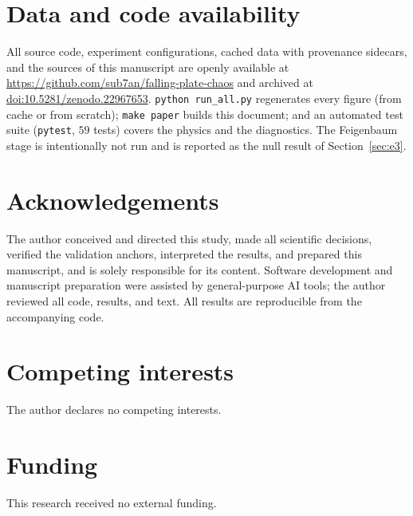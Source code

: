 \documentclass[11pt]{article}
\begin{document}
\section*{Data and code availability}\label{sec:availability}
All source code, experiment configurations, cached data with provenance sidecars, and the sources of
this manuscript are openly available at \url{https://github.com/sub7an/falling-plate-chaos} and
archived at \href{https://doi.org/10.5281/zenodo.22967653}{doi:10.5281/zenodo.22967653}.
\texttt{python run\_all.py} regenerates every figure (from cache or from scratch); \texttt{make paper}
builds this document; and an automated test suite (\texttt{pytest}, $59$ tests) covers the physics and
the diagnostics. The Feigenbaum stage is
intentionally not run and is reported as the null result of Section~\ref{sec:e3}.

\section*{Acknowledgements}
The author conceived and directed this study, made all scientific decisions, verified the validation
anchors, interpreted the results, and prepared this manuscript, and is solely responsible for its
content. Software development and manuscript preparation were assisted by general-purpose AI tools;
the author reviewed all code, results, and text. All results are reproducible from the accompanying
code.

\section*{Competing interests}
The author declares no competing interests.

\section*{Funding}
This research received no external funding.
\end{document}
